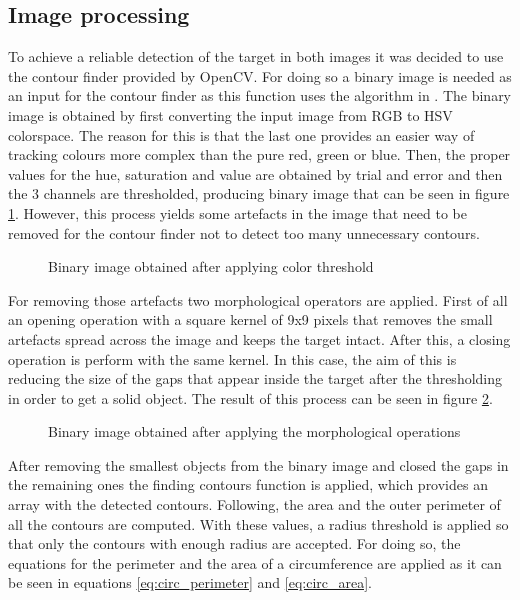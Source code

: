 \subsection{Image processing}
To achieve a reliable detection of the target in both images it was decided to use the contour finder provided by OpenCV.
For doing so a binary image is needed as an input for the contour finder as this function uses the algorithm in \cite{suzuki}. 
The binary image is obtained by first converting the input image from RGB to HSV colorspace.
The reason for this is that the last one provides an easier way of tracking colours more complex than the pure red, green or blue.
Then, the proper values for the hue, saturation and value are obtained by trial and error and then the 3 channels are thresholded, producing binary image that can be seen in figure \ref{fig:binary_image}.
However, this process yields some artefacts in the image that need to be removed for the contour finder not to detect too many unnecessary contours.
 
\begin{figure}[!ht]
    \centering
    \caption{Binary image obtained after applying color threshold}
    \label{fig:binary_image}
\end{figure}

For removing those artefacts two morphological operators are applied. First of all an opening operation with a square kernel of 9x9 pixels that removes the small artefacts spread across the image and keeps the target intact. After this, a closing operation is perform with the same kernel. In this case, the aim of this is reducing the size of the gaps that appear inside the target after the thresholding in order to get a solid object. The result of this process can be seen in figure \ref{fig:filtered_image}.

\begin{figure}[h]
    \centering
    \caption{Binary image obtained after applying the morphological operations}
    \label{fig:filtered_image}
\end{figure}

After removing the smallest objects from the binary image and closed the gaps in the remaining ones the finding contours function is applied, which provides an array with the detected contours. Following, the area and the outer perimeter of all the contours are computed. With these values, a radius threshold is applied so that only the contours with enough radius are accepted. For doing so, the equations for the perimeter and the area of a circumference are applied as it can be seen in equations \ref{eq:circ_perimeter} and \ref{eq:circ_area}.

